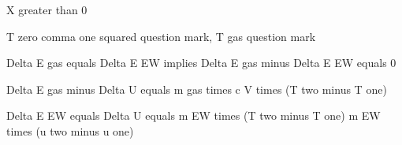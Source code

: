 X greater than 0

T zero comma one squared question mark, T gas question mark

Delta E gas equals Delta E EW implies Delta E gas minus Delta E EW equals 0

Delta E gas minus Delta U equals m gas times c V times (T two minus T one)

Delta E EW equals Delta U equals m EW times (T two minus T one) m EW times (u two minus u one)